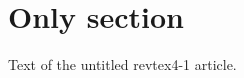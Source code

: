 \documentclass{revtex4-1}
\begin{document}
\section{Only section}
Text of the untitled revtex4-1 article.
\end{document}
